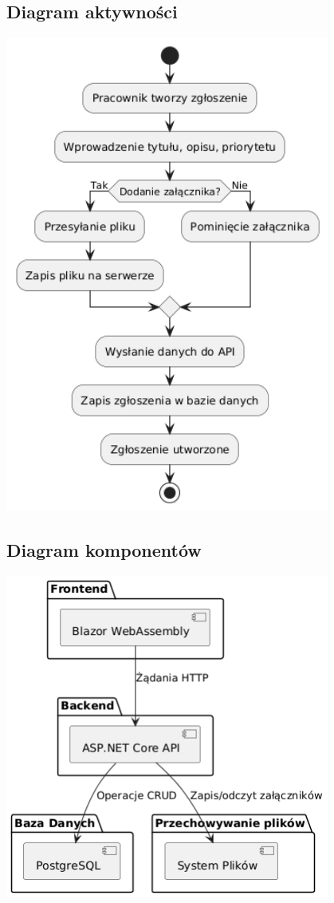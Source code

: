 \documentclass[a4paper,12pt]{article}
\begin{document}
\subsection{Diagram aktywności}
\begin{center}
\includegraphics[width=0.8\textwidth]{draw/diagramAktywnosci.png}
\end{center}

\subsection{Diagram komponentów}
\begin{center}
\includegraphics[width=0.8\textwidth]{draw/diagramKomponentow.png}
\end{center}
\end{document}
